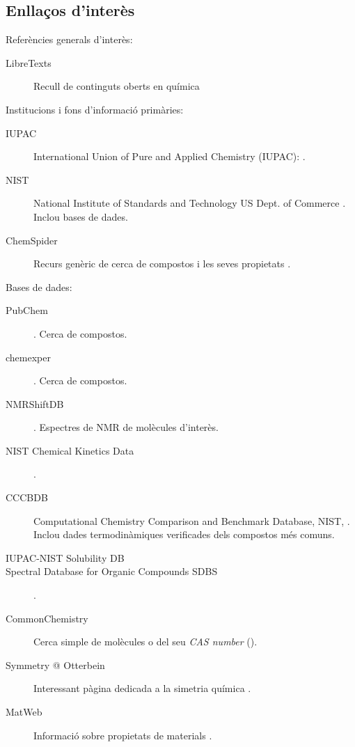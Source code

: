 \documentclass{book}
\begin{document}

%
%

%
%


\begin{appendix}
\chapter{Enllaços d'interès}
\label{sec:EnllacosInteres}

Referències generals d'interès:
\begin{description}
\item[LibreTexts] Recull de continguts oberts en química 
\end{description}

Institucions i fons d'informació primàries:
\begin{description}
\item[IUPAC] International Union of Pure and Applied Chemistry (IUPAC): .
\item[NIST] National Institute of Standards and Technology US Dept. of Commerce . Inclou bases de dades.
\item[ChemSpider] Recurs genèric de cerca de compostos i les seves propietats .
\end{description}

Bases de dades:
\begin{description}
\item[PubChem] . Cerca de compostos.
\item[chemexper] . Cerca de compostos. 
\item[NMRShiftDB] . Espectres de NMR de molècules d'interès.
\item[NIST Chemical Kinetics Data] .
\item[CCCBDB] Computational Chemistry Comparison and Benchmark Database, NIST, . Inclou dades termodinàmiques verificades dels compostos més comuns.
\item[IUPAC-NIST Solubility DB] 
\item[Spectral Database for Organic Compounds SDBS] .
\item[CommonChemistry] Cerca simple de molècules o del seu \textit{CAS number} ().
\item[Symmetry @ Otterbein] Interessant pàgina dedicada a la simetria química .
\item[MatWeb] Informació sobre propietats de materials .
\end{description}

  \listoffigures
  \listoftables
  \printbibliography
\end{appendix}
\end{document}
